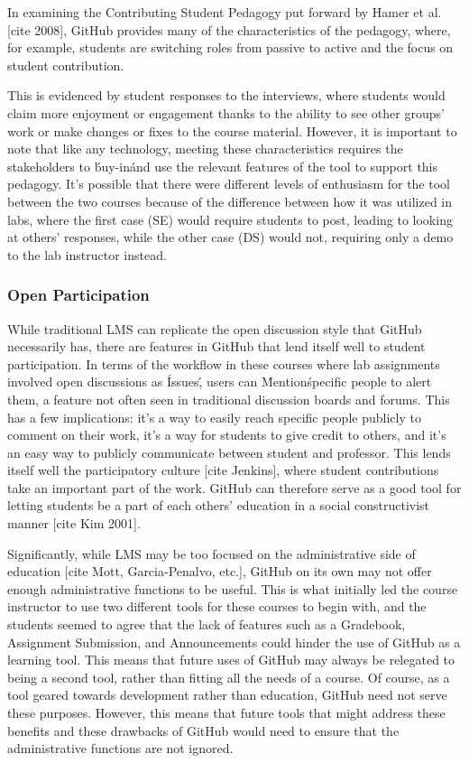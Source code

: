 In examining the Contributing Student Pedagogy put forward by Hamer et al. [cite 2008], GitHub provides many of the characteristics of the pedagogy, where, for example, students are switching roles from passive to active and the focus on student contribution. %

This is evidenced by student responses to the interviews, where students would claim more enjoyment or engagement thanks to the ability to see other groups' work or make changes or fixes to the course material. However, it is important to note that like any technology, meeting these characteristics requires the stakeholders to \'buy-in\' and use the relevant features of the tool to support this pedagogy. It's possible that there were different levels of enthusiasm for the tool between the two courses because of the difference between how it was utilized in labs, where the first case (SE) would require students to post, leading to looking at others' responses, while the other case (DS) would not, requiring only a demo to the lab instructor instead.

\subsubsection{Open Participation}
While traditional LMS can replicate the open discussion style that GitHub necessarily has, there are features in GitHub that lend itself well to student participation. In terms of the workflow in these courses where lab assignments involved open discussions as \'Issues\', users can \'Mention\' specific people to alert them, a feature not often seen in traditional discussion boards and forums. This has a few implications: it's a way to easily reach specific people publicly to comment on their work, it's a way for students to give credit to others, and it's an easy way to publicly communicate between student and professor. This lends itself well the participatory culture [cite Jenkins], where student contributions take an important part of the work. GitHub can therefore serve as a good tool for letting students be a part of each others' education in a social constructivist manner [cite Kim 2001].

Significantly, while LMS may be too focused on the administrative side of education [cite Mott, Garcia-Penalvo, etc.], GitHub on its own may not offer enough administrative functions to be useful. This is what initially led the course instructor to use two different tools for these courses to begin with, and the students seemed to agree that the lack of features such as a Gradebook, Assignment Submission, and Announcements could hinder the use of GitHub as a learning tool. This means that future uses of GitHub may always be relegated to being a second tool, rather than fitting all the needs of a course. Of course, as a tool geared towards development rather than education, GitHub need not serve these purposes. However, this means that future tools that might address these benefits and these drawbacks of GitHub would need to ensure that the administrative functions are not ignored.

